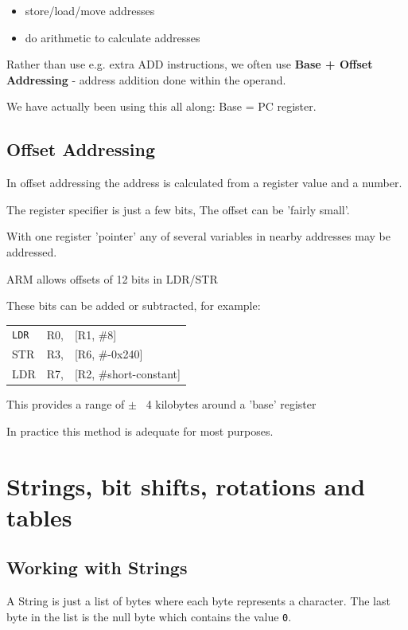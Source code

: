 \begin{itemize}
  \item store/load/move addresses
  \item do arithmetic to calculate addresses
\end{itemize}

Rather than use e.g. extra ADD instructions, we often use {\bf Base + Offset
Addressing} - address addition done within the operand.

We have actually been using this all along: Base = PC register.

\subsection{Offset Addressing}

In offset addressing the address is calculated from a register value and a
number.

The register specifier is just a few bits, The offset can be 'fairly small'.

With one register 'pointer' any of several variables in nearby addresses may be
addressed.

ARM allows offsets of 12 bits in LDR/STR

These bits can be added or subtracted, for example:

\begin{center}
    \begin{tabular}{l l l}
        {\tt LDR} & R0, & [R1, \#8] \\
        STR & R3, & [R6, \#-0x240]\\
        LDR & R7, & [R2, \#short-constant]
    \end{tabular}
\end{center}

This provides a range of $\pm$ ~4 kilobytes around a 'base' register

In practice this method is adequate for most purposes. 

\section{Strings, bit shifts, rotations and tables}

\subsection{Working with Strings}

A String is just a list of bytes where each byte represents a character. The
last byte in the list is the null byte which contains the value {\tt 0}.

